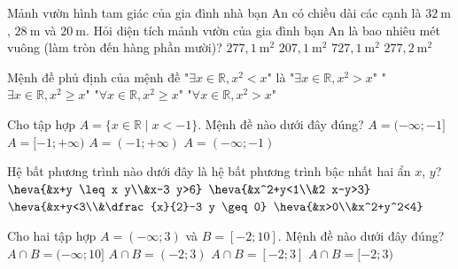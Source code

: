 \begin{ex}%
	Mảnh vườn hình tam giác của gia đình nhà bạn An có chiều dài các cạnh là $32 \mathrm{~m}$, $28 \mathrm{~m}$ và $20 \mathrm{~m}$. Hỏi diện tích mảnh vườn của gia đình bạn $\mathrm{An}$ là bao nhiêu mét vuông (làm tròn đến hàng phần mười)?
	\choice
	{\True $277{,}1 \mathrm{~m}^2$}
	{$207{,}1 \mathrm{~m}^2$}
	{$727{,}1 \mathrm{~m}^2$}
	{$277{,}2 \mathrm{~m}^2$}
\end{ex}
\begin{ex}%
	Mệnh đề phủ định của mệnh đề "$\exists x \in \mathbb{R}, x^2<x$" là
	\choice
	{"$\exists x \in \mathbb{R}, x^2>x$"}
	{"$\exists x \in \mathbb{R}, x^2 \geq x$"}
	{\True "$\forall x \in \mathbb{R}, x^2 \geq x$"}
	{"$\forall x \in \mathbb{R}, x^2>x$"}
\end{ex}
\begin{ex}%
	Cho tập hợp $A=\{x \in \mathbb{R} \mid x<-1\}$. Mệnh đề nào dưới đây đúng?
	\choice
	{$A=(-\infty ;-1]$}
	{$A=[-1 ;+\infty)$}
	{$A=(-1 ;+\infty)$}
	{\True $A=(-\infty ;-1)$}
\end{ex}
\begin{ex}%
	Hệ bất phương trình nào dưới đây là hệ bất phương trình bậc nhất hai ẩn $x$, $y$?
	\choice
	{$\heva{&x+y \leq x y\\&x-3 y>6}$}
	{$\heva{&x^2+y<1\\&2 x-y>3}$}
	{\True $\heva{&x+y<3\\&\dfrac{x}{2}-3 y \geq 0}$}
	{$\heva{&x>0\\&x^2+y^2<4}$}
\end{ex}
\begin{ex}%
	Cho hai tập hợp $A=(-\infty ; 3)$ và $B=[-2 ; 10]$. Mệnh đề nào dưới đây đúng?
	\choice
	{$A \cap B=(-\infty ; 10]$}
	{$A \cap B=(-2 ; 3)$}
	{$A \cap B=[-2 ; 3]$}
	{\True $A \cap B=[-2 ; 3)$}
	\loigiai{
		$A \cap B=[-2 ; 3)$.
	}
\end{ex}
